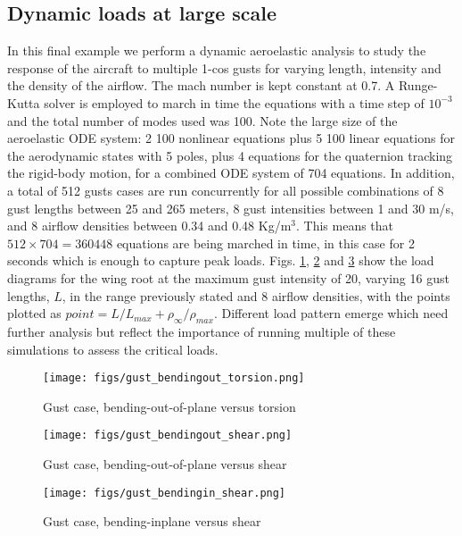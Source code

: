 \documentclass[11pt]{article}
\begin{document}
\subsection{Dynamic loads at large scale}
\label{sec:orge11333e}
In this final example we perform a dynamic aeroelastic analysis to study the response of the aircraft to multiple 1-cos gusts for varying length, intensity and the density of the airflow. The mach number is kept constant at 0.7. A Runge-Kutta solver is employed to march in time the equations with a time step of \(10^{-3}\) and the total number of modes used was 100. Note the large size of the aeroelastic ODE system: 2 \texttimes{} 100 nonlinear equations plus 5 \texttimes{} 100 linear equations for the aerodynamic states with 5 poles, plus 4 equations for the quaternion tracking the rigid-body motion, for a combined ODE system of 704 equations.  
In addition, a total of 512 gusts cases are run concurrently for all possible combinations of 8 gust lengths between 25 and 265 meters, 8 gust intensities between 1 and 30 m/s, and 8 airflow densities between 0.34 and 0.48 Kg/m\(^3\). This means that \(512 \times 704 = 360448\) equations are being marched in time, in this case for 2 seconds which is enough to capture peak loads. Figs. \ref{fig:org786f0a9}, \ref{fig:org2cc043d} and \ref{fig:org15e0bb1} show the load diagrams for the wing root at the maximum gust intensity of 20, varying 16 gust lengths, \(L\), in the range previously stated and 8 airflow densities,  with the points plotted as \(point = L / L_{max} + \rho_{\infty} / \rho_{max}\). Different load pattern emerge which need further analysis but reflect the importance of running multiple of these simulations to assess the critical loads. 

\begin{figure}[htbp]
\centering
\texttt{[image: figs/gust\_bendingout\_torsion.png]}
\caption{\label{fig:org786f0a9}Gust case, bending-out-of-plane versus torsion}
\end{figure}

\begin{figure}[htbp]
\centering
\texttt{[image: figs/gust\_bendingout\_shear.png]}
\caption{\label{fig:org2cc043d}Gust case, bending-out-of-plane versus shear}
\end{figure}

\begin{figure}[htbp]
\centering
\texttt{[image: figs/gust\_bendingin\_shear.png]}
\caption{\label{fig:org15e0bb1}Gust case, bending-inplane versus shear}
\end{figure}
\end{document}
